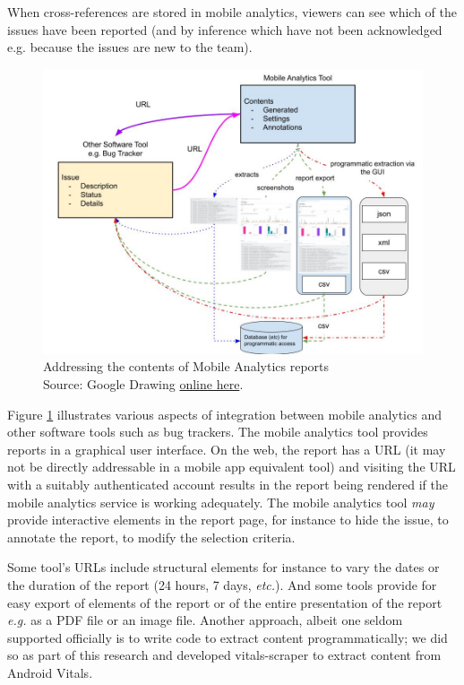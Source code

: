 When cross-references are stored in mobile analytics, viewers can see which of the issues have been reported (and by inference which have not been acknowledged e.g. because the issues are new to the team).

\begin{figure}
    \centering
    \includegraphics[width=\textwidth]{images/rough-sketches/integration-of-mobile-analytics-tool.jpeg}
    \caption[Addressing the contents of Mobile Analytics reports]{Addressing the contents of Mobile Analytics reports\\Source: Google Drawing \href{https://docs.google.com/drawings/d/1y7QP8UK7ugl0DzWIeH4udRxwsVMHjyQ6Am0qW6glkdE/edit?usp=sharing}{online here}.}
    \label{fig:addressing-the-contents-of-mobile-analytics}
\end{figure}

Figure \ref{fig:addressing-the-contents-of-mobile-analytics} illustrates various aspects of integration between mobile analytics and other software tools such as bug trackers. The mobile analytics tool provides reports in a graphical user interface. On the web, the report has a URL (it may not be directly addressable in a mobile app equivalent tool) and visiting the URL with a suitably authenticated account results in the report being rendered if the mobile analytics service is working adequately. The mobile analytics tool \emph{may} provide interactive elements in the report page, for instance to hide the issue, to annotate the report, to modify the selection criteria. 

Some tool's URLs include structural elements for instance to vary the dates or the duration of the report (24 hours, 7 days, \emph{etc.}). And some tools provide for easy export of elements of the report or of the entire presentation of the report \emph{e.g.} as a PDF file or an image file. Another approach, albeit one seldom supported officially is to write code to extract content programmatically; we did so as part of this research and developed vitals-scraper to extract content from Android Vitals.

